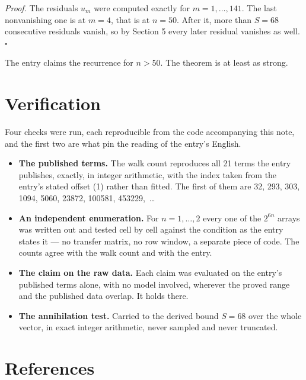 \documentclass[11pt]{article}
\theoremstyle{definition}
\begin{document}
{\itshape Proof.} The residuals $u_m$ were computed exactly for $m = 1,\dots,141$. The last nonvanishing one is at $m = 4$, that is at $n = 50$. After it, more than $S = 68$ consecutive residuals vanish, so by Section 5 every later residual vanishes as well. $\square$

The entry claims the recurrence for $n > 50$. The theorem is at least as strong.

\section{Verification}

Four checks were run, each reproducible from the code accompanying this note, and the first two are what pin the reading of the entry's English.

\begin{itemize}

\item {\bfseries The published terms.} The walk count reproduces all 21 terms the entry publishes, exactly, in integer arithmetic, with the index taken from the entry's stated offset (1) rather than fitted. The first of them are 32, 293, 303, 1094, 5060, 23872, 100581, 453229,~\dots

\item {\bfseries An independent enumeration.} For $n = 1,\dots,2$ every one of the $2^{6n}$ arrays was written out and tested cell by cell against the condition as the entry states it --- no transfer matrix, no row window, a separate piece of code. The counts agree with the walk count and with the entry.

\item {\bfseries The claim on the raw data.} Each claim was evaluated on the entry's published terms alone, with no model involved, wherever the proved range and the published data overlap. It holds there.

\item {\bfseries The annihilation test.} Carried to the derived bound $S = 68$ over the whole vector, in exact integer arithmetic, never sampled and never truncated.

\end{itemize}

\section{References}
\end{document}
